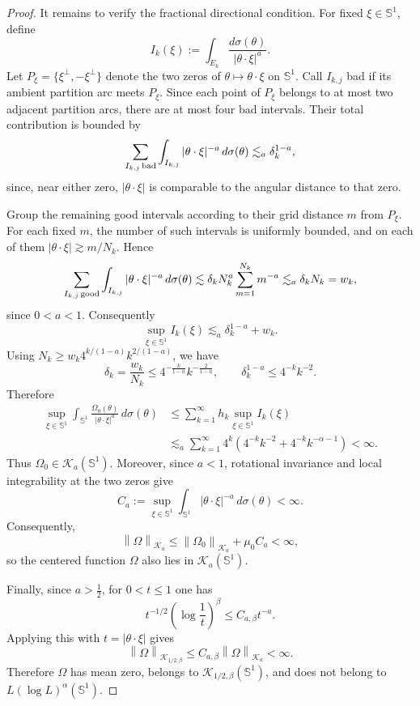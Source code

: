 \documentclass[11pt]{amsart}
\theoremstyle{remark}
\numberwithin{equation}{section}
\newcommand{\Sph}{\mathbb S^1}
\newcommand{\cK}{\mathcal K}
\newcommand{\norm}[1]{\left\lVert #1\right\rVert}
\begin{document}
\begin{proof}
		It remains to verify the fractional directional condition. For fixed
		\(\xi\in\Sph\), define
		\[
		I_k(\xi):=\int_{E_k}\frac{d\sigma(\theta)}{|\theta\cdot\xi|^a}.
		\]
		Let \(P_\xi=\{\xi^\perp,-\xi^\perp\}\) denote the two zeros of
		\(\theta\mapsto\theta\cdot\xi\) on \(\Sph\). Call \(I_{k,j}\) bad if its
		ambient partition arc meets \(P_\xi\). Since each point of \(P_\xi\) belongs to
		at most two adjacent partition arcs, there are at most four bad intervals.
		Their total contribution is bounded by
		\[
		\sum_{I_{k,j}\,{\rm bad}}
		\int_{I_{k,j}}|\theta\cdot\xi|^{-a}\,d\sigma(\theta)
		\lesssim_a \delta_k^{1-a},
		\]
		since, near either zero, \(|\theta\cdot\xi|\) is comparable to the angular
		distance to that zero.
		
		Group the remaining good intervals according to their grid distance \(m\) from
		\(P_\xi\). For each fixed \(m\), the number of such intervals is uniformly
		bounded, and on each of them
		\(|\theta\cdot\xi|\gtrsim m/N_k\). Hence
		\[
		\sum_{I_{k,j}\,{\rm good}}
		\int_{I_{k,j}}|\theta\cdot\xi|^{-a}\,d\sigma(\theta)
		\lesssim
		\delta_k N_k^a
		\sum_{m=1}^{N_k}m^{-a}
		\lesssim_a \delta_kN_k=w_k,
		\]
		since \(0<a<1\). Consequently
		\[
		\sup_{\xi\in\Sph} I_k(\xi)
		\lesssim_a \delta_k^{1-a}+w_k.
		\]
		Using \(N_k\ge w_k4^{k/(1-a)}k^{2/(1-a)}\), we have
		\[
		\delta_k=\frac{w_k}{N_k}
		\le 4^{-\frac{k}{1-a}}k^{-\frac{2}{1-a}},
		\qquad
		\delta_k^{1-a}\le 4^{-k}k^{-2}.
		\]
		Therefore
		\[
		\begin{aligned}
			\sup_{\xi\in\Sph}
			\int_{\Sph}\frac{\Omega_0(\theta)}{|\theta\cdot\xi|^a}
			\,d\sigma(\theta)
			&\le
			\sum_{k=1}^\infty h_k\sup_{\xi\in\Sph}I_k(\xi)\\
			&\lesssim_a
			\sum_{k=1}^\infty 4^k(4^{-k}k^{-2}+4^{-k}k^{-\alpha-1})
			<\infty.
		\end{aligned}
		\]
		Thus \(\Omega_0\in\cK_a(\Sph)\).  Moreover, since \(a<1\), rotational invariance
		and local integrability at the two zeros give
		\[
		C_a:=\sup_{\xi\in\Sph}
		\int_{\Sph}|\theta\cdot\xi|^{-a}\,d\sigma(\theta)<\infty.
		\]
		Consequently,
		\[
		\norm{\Omega}_{\cK_a}
		\le \norm{\Omega_0}_{\cK_a}+\mu_0 C_a<\infty,
		\]
		so the centered function \(\Omega\) also lies in \(\cK_a(\Sph)\).
		
		Finally, since \(a>\frac12\), for \(0<t\le1\) one has
		\[
		t^{-1/2}\left(\log\frac1t\right)^\beta\le C_{a,\beta}t^{-a}.
		\]
		Applying this with \(t=|\theta\cdot\xi|\) gives
		\[
		\norm{\Omega}_{\cK_{1/2,\beta}}
		\le C_{a,\beta}\norm{\Omega}_{\cK_a}<\infty.
		\]
		Therefore \(\Omega\) has mean zero, belongs to
		\(\cK_{1/2,\beta}(\Sph)\), and does not belong to
		\(L(\log L)^\alpha(\Sph)\).
	\end{proof}
	
\end{document}
